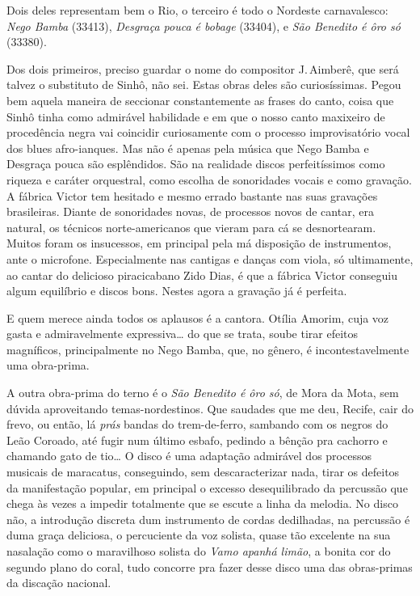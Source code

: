 Dois deles representam bem o Rio, o terceiro é todo o Nordeste
carnavalesco: \textit{Nego Bamba} (33413), \textit{Desgraça pouca é bobage}
(33404), e \textit{São Benedito é ôro só} (33380).

Dos dois primeiros, preciso guardar o nome do compositor J.\,Aimberê, que
será talvez o substituto de Sinhô, não sei. Estas obras deles são
curiosíssimas. Pegou bem aquela maneira de seccionar constantemente as
frases do canto, coisa que Sinhô tinha como admirável habilidade e em
que o nosso canto maxixeiro de procedência negra vai coincidir
curiosamente com o processo improvisatório vocal dos blues afro-ianques.
Mas não é apenas pela música que Nego Bamba e Desgraça pouca são
esplêndidos. São na realidade discos perfeitíssimos como riqueza e
caráter orquestral, como escolha de sonoridades vocais e como gravação.
A fábrica Victor tem hesitado e mesmo errado bastante nas suas gravações
brasileiras. Diante de sonoridades novas, de processos novos de cantar,
era natural, os técnicos norte-americanos que vieram para cá se
desnortearam. Muitos foram os insucessos, em principal pela má
disposição de instrumentos, ante o microfone. Especialmente nas cantigas
e danças com viola, só ultimamente, ao cantar do delicioso piracicabano
Zido Dias, é que a fábrica Victor conseguiu algum equilíbrio e discos
bons. Nestes agora a gravação já é perfeita.

E quem merece ainda todos os aplausos é a cantora. Otília Amorim, cuja
voz gasta e admiravelmente expressiva\ldots{} do que se trata, soube tirar
efeitos magníficos, principalmente no Nego Bamba, que, no gênero, é
incontestavelmente uma obra-prima.

A outra obra-prima do terno é o \textit{São Benedito é ôro só}, de Mora da
Mota, sem dúvida aproveitando temas-nordestinos. Que saudades que me
deu, Recife, cair do frevo, ou então, lá \textit{prás} bandas do trem-de-ferro,
sambando com os negros do Leão Coroado, até fugir num último esbafo,
pedindo a bênção pra cachorro e chamando gato de tio\ldots{} O disco é uma
adaptação admirável dos processos musicais de maracatus, conseguindo,
sem descaracterizar nada, tirar os defeitos da manifestação popular, em
principal o excesso desequilibrado da percussão que chega às vezes a
impedir totalmente que se escute a linha da melodia. No disco não, a
introdução discreta dum instrumento de cordas dedilhadas, na percussão é
duma graça deliciosa, o percuciente da voz solista, quase tão excelente
na sua nasalação como o maravilhoso solista do \textit{Vamo apanhá limão},
a bonita cor do segundo plano do coral, tudo concorre pra fazer desse
disco uma das obras-primas da discação nacional.


